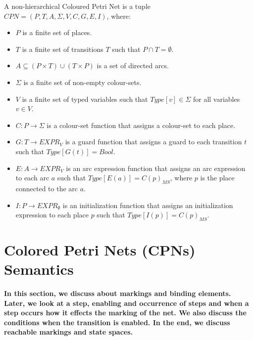 \begin{defs}
	\label{defs:CPN_NonHeir}
	A non-hierarchical Coloured Petri Net is a tuple $\mathit{CPN} = \mathit{(P,T,A,\Sigma,V,C,G,E,I)}$, where:
	\begin{itemize}
		\item $\mathit{P}$ is a finite set of places.
		\item $\mathit{T}$ is a finite set of transitions $\mathit{T}$ such that $\mathit{P \cap T = \emptyset}$.
		\item $\mathit{A \subseteq (P \times T) \cup (T \times P)}$ is a set of directed arcs.
		\item $\mathit{\Sigma}$ is a finite set of non-empty colour-sets.
		\item $\mathit{V}$ is a finite set of typed variables such that $\mathit{Type[v] \in \Sigma}$ for all variables $\mathit{v \in V}$.
		\item $\mathit{C : P \rightarrow \Sigma}$ is a colour-set function that assigns a colour-set to each place.
		\item $\mathit{G : T \rightarrow EXPR_{V}}$ is a guard function that assigns a guard to each transition $\mathit{t}$ such that $\mathit{Type[G(t)] = Bool}$.
		\item $\mathit{E : A \rightarrow EXPR_{V}}$ is an arc expression function that assigns an arc expression to each arc $\mathit{a}$ such that $\mathit{Type[E(a)] = C(p)_{MS}}$, where $\mathit{p}$ is the place connected to the arc $\mathit{a}$.
		\item $\mathit{I : P \rightarrow EXPR_{\emptyset}}$ is an initialization function that assigns an initialization expression to each place $\mathit{p}$ such that $\mathit{Type[I(p)] =C(p)_{MS}}$.
	\end{itemize}
\end{defs}

\section{Colored Petri Nets (CPNs) Semantics} \label{sec:CPN_Semantics}
\paragraph{\textnormal{In this section, we discuss about markings and binding elements. Later, we look at a step, enabling and occurrence of steps and when a step occurs how it effects the marking of the net. We also discuss the conditions when the transition is enabled. In the end, we discuss reachable markings and state spaces.}}

